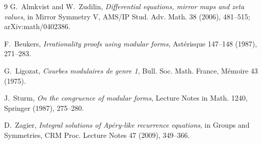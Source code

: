\documentclass[11pt]{article}
\theoremstyle{remark}
\begin{document}
\begin{thebibliography}{9}
G.~Almkvist and W.~Zudilin,
\emph{Differential equations, mirror maps and zeta values},
in Mirror Symmetry V, AMS/IP Stud. Adv. Math. 38 (2006), 481--515;
arXiv:math/0402386.

F.~Beukers,
\emph{Irrationality proofs using modular forms},
Ast\'erisque 147--148 (1987), 271--283.

G.~Ligozat,
\emph{Courbes modulaires de genre 1},
Bull. Soc. Math. France, M\'emoire 43 (1975).

J.~Sturm,
\emph{On the congruence of modular forms},
Lecture Notes in Math. 1240, Springer (1987), 275--280.

D.~Zagier,
\emph{Integral solutions of Ap\'ery-like recurrence equations},
in Groups and Symmetries, CRM Proc. Lecture Notes 47 (2009), 349--366.
\end{thebibliography}
\end{document}
